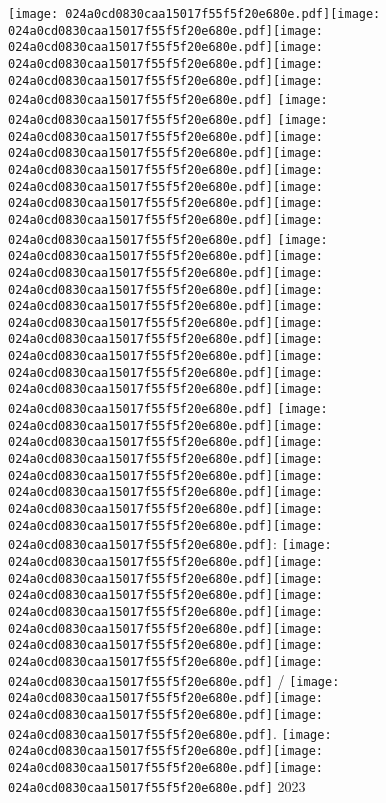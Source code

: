 \documentclass{article}
\newcommand{\origpg}[2]{\texttt{[image: 024a0cd0830caa15017f55f5f20e680e.pdf]}}
\begin{document}
{\vspace{0.626pt}\origpg{15}{85.303pt 558.82pt 93.938pt 574.96pt}\origpg{15}{93.938pt 558.82pt 102.01pt 574.96pt}\hspace{-0.565pt}\origpg{15}{101.44pt 558.82pt 112.6pt 574.96pt}\origpg{15}{112.53pt 558.82pt 119.7pt 574.96pt}\origpg{15}{119.75pt 558.82pt 127.82pt 574.96pt}\origpg{15}{127.91pt 558.82pt 135.08pt 574.96pt} \origpg{15}{138.99pt 558.82pt 146.15pt 574.96pt} \origpg{15}{150.06pt 558.82pt 158.69pt 574.96pt}\origpg{15}{158.69pt 558.82pt 166.76pt 574.96pt}\hspace{-0.323pt}\origpg{15}{166.44pt 558.82pt 176.66pt 574.96pt}\origpg{15}{176.56pt 558.82pt 184.63pt 574.96pt}\hspace{-0.113pt}\origpg{15}{184.52pt 558.82pt 196.95pt 574.96pt}\origpg{15}{197.03pt 558.82pt 204.39pt 574.96pt}\origpg{15}{204.48pt 558.82pt 216.54pt 574.96pt} \origpg{15}{220.36pt 558.82pt 228.21pt 574.96pt}\origpg{15}{228.31pt 558.82pt 236.36pt 574.96pt}\origpg{15}{236.26pt 558.82pt 243.43pt 574.96pt}\hspace{-0.178pt}\origpg{15}{243.25pt 558.82pt 250.3pt 574.96pt}\hspace{-0.307pt}\origpg{15}{250pt 558.82pt 258.07pt 574.96pt}\hspace{-0.597pt}\origpg{15}{257.47pt 558.82pt 265.59pt 574.96pt}\origpg{15}{265.64pt 558.82pt 274.27pt 574.96pt}\origpg{15}{274.27pt 558.82pt 282.34pt 574.96pt}\origpg{15}{282.26pt 558.82pt 288.88pt 574.96pt}\hspace{-0.597pt}\origpg{15}{288.28pt 558.82pt 296.35pt 574.96pt} \origpg{15}{300.52pt 558.82pt 307.69pt 574.96pt}\origpg{15}{307.74pt 558.82pt 315.36pt 574.96pt}\hspace{-0.387pt}\origpg{15}{314.97pt 558.82pt 322.02pt 574.96pt}\hspace{-0.307pt}\origpg{15}{321.71pt 558.82pt 329.79pt 574.96pt}\hspace{-0.355pt}\origpg{15}{329.43pt 558.82pt 339.65pt 574.96pt}\origpg{15}{339.55pt 558.82pt 346.72pt 574.96pt}\hspace{-0.42pt}\origpg{15}{346.3pt 558.82pt 353.35pt 574.96pt}\hspace{0.161pt}\origpg{15}{353.51pt 558.82pt 360.68pt 574.96pt}: \origpg{15}{369.2pt 558.82pt 379.96pt 574.96pt}\hspace{-0.161pt}\origpg{15}{379.8pt 558.82pt 387.42pt 574.96pt}\origpg{15}{387.5pt 558.82pt 394.67pt 574.96pt}\hspace{-0.42pt}\origpg{15}{394.25pt 558.82pt 402.46pt 574.96pt}\origpg{15}{402.46pt 558.82pt 409.63pt 574.96pt}\hspace{-0.21pt}\origpg{15}{409.42pt 558.82pt 418.06pt 574.96pt}\origpg{15}{418.06pt 558.82pt 426.69pt 574.96pt}\origpg{15}{426.76pt 558.82pt 433.92pt 574.96pt} / \origpg{15}{446.32pt 558.82pt 454.39pt 574.96pt}\origpg{15}{454.48pt 558.82pt 461.65pt 574.96pt}\hspace{-0.42pt}\origpg{15}{461.23pt 558.82pt 469.45pt 574.96pt}. \origpg{15}{477.6pt 558.82pt 488.36pt 574.96pt}\hspace{-0.161pt}\origpg{15}{488.2pt 558.82pt 504.49pt 574.96pt}\origpg{15}{504.57pt 558.82pt 515.22pt 574.96pt} 2023 

}
\end{document}
